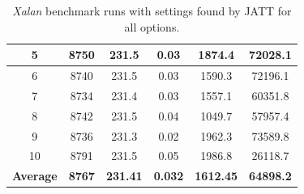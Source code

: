 \documentclass[
  digital, %
  oneside,
  notable, %
  nolof,     %
  nolot     %
]{fithesis3}
\begin{document}
\begin{table}[]
\begin{tabular}{|c|c|c|c|c|c|}
		5                & 8750                                                         & 231.5                                                                 & 0.03                                                                  & 1874.4                                                               & 72028.1                                                         \\ \hline
		6                & 8740                                                         & 231.5                                                                 & 0.03                                                                  & 1590.3                                                               & 72196.1                                                         \\ \hline
		7                & 8734                                                         & 231.4                                                                 & 0.03                                                                  & 1557.1                                                               & 60351.8                                                         \\ \hline
		8                & 8742                                                         & 231.5                                                                 & 0.04                                                                  & 1049.7                                                               & 57957.4                                                         \\ \hline
		9                & 8736                                                         & 231.3                                                                 & 0.02                                                                  & 1962.3                                                               & 73589.8                                                         \\ \hline
		10               & 8791                                                         & 231.5                                                                 & 0.05                                                                  & 1986.8                                                               & 26118.7                                                         \\ \hline
		\textbf{Average} & \textbf{8767}                                                & \textbf{231.41}                                                       & \textbf{0.032}                                                        & \textbf{1612.45}                                                     & \textbf{64898.2}                                                \\ \hline
	\end{tabular}
	\caption{\textit{Xalan} benchmark runs with settings found by JATT for all options.}
	\label{jattalloptionsresults}
\end{table}
\end{document}
